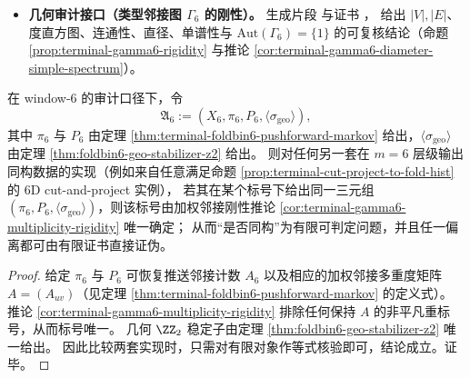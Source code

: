 \begin{itemize}
  与计数直方图片段 
  与证书 ，
  给出逐 \(w\in X_6\) 的 \(\delta_{\min}(w)\) 与预像清单，可直接核验定理 \ref{thm:terminal-foldbin6-fiber-hamming-three-valued} 的 \(\{2,3,5\}\) 三值律。
  \item \textbf{几何审计接口（类型邻接图 \texorpdfstring{$\Gamma_6$}{Gamma6} 的刚性）。}
  \texttt{} 生成片段
  \texttt{}
  与证书 \texttt{}，
  给出 \(|V|,|E|\)、度直方图、连通性、直径、单谱性与 \(\mathrm{Aut}(\Gamma_6)=\{1\}\) 的可复核结论（命题 \ref{prop:terminal-gamma6-rigidity} 与推论 \ref{cor:terminal-gamma6-diameter-simple-spectrum}）。
\end{itemize}

\begin{corollary}\label{cor:terminal-window6-finite-completeness-template}
在 window-\(6\) 的审计口径下，令
\[
\mathfrak{A}_6:=(X_6,\pi_6,P_6,\langle\sigma_{\mathrm{geo}}\rangle),
\]
其中 \(\pi_6\) 与 \(P_6\) 由定理 \ref{thm:terminal-foldbin6-pushforward-markov} 给出，\(\langle\sigma_{\mathrm{geo}}\rangle\) 由定理 \ref{thm:foldbin6-geo-stabilizer-z2} 给出。
则对任何另一套在 \(m=6\) 层级输出同构数据的实现（例如来自任意满足命题 \ref{prop:terminal-cut-project-to-fold-hist} 的 6D cut-and-project 实例），
若其在某个标号下给出同一三元组 \((\pi_6,P_6,\langle\sigma_{\mathrm{geo}}\rangle)\)，则该标号由加权邻接刚性推论 \ref{cor:terminal-gamma6-multiplicity-rigidity} 唯一确定；
从而“是否同构”为有限可判定问题，并且任一偏离都可由有限证书直接证伪。
\end{corollary}
\begin{proof}
给定 \(\pi_6\) 与 \(P_6\) 可恢复推送邻接计数 \(A_6\) 以及相应的加权邻接多重度矩阵 \(A=(A_{uv})\)（见定理 \ref{thm:terminal-foldbin6-pushforward-markov} 的定义式）。
推论 \ref{cor:terminal-gamma6-multiplicity-rigidity} 排除任何保持 \(A\) 的非平凡重标号，从而标号唯一。
几何 \(\ZZ_2\) 稳定子由定理 \ref{thm:foldbin6-geo-stabilizer-z2} 唯一给出。
因此比较两套实现时，只需对有限对象作等式核验即可，结论成立。证毕。
\end{proof}

